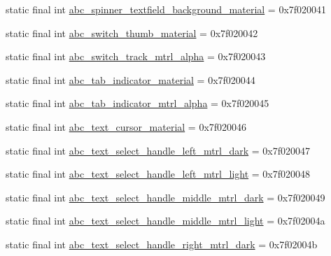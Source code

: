 \begin{CompactItemize}
static final int \hyperlink{classandroid_1_1support_1_1graphics_1_1drawable_1_1_r_1_1drawable_e69c3db62a9ce20a3c8dbb4e6c42f2a8}{abc\_\-spinner\_\-textfield\_\-background\_\-material} = 0x7f020041
\item 
static final int \hyperlink{classandroid_1_1support_1_1graphics_1_1drawable_1_1_r_1_1drawable_9b4d2fbe5c8590612a866f5e211bb76a}{abc\_\-switch\_\-thumb\_\-material} = 0x7f020042
\item 
static final int \hyperlink{classandroid_1_1support_1_1graphics_1_1drawable_1_1_r_1_1drawable_1c773f678c0e5fe94f5f5fa2d3718a0e}{abc\_\-switch\_\-track\_\-mtrl\_\-alpha} = 0x7f020043
\item 
static final int \hyperlink{classandroid_1_1support_1_1graphics_1_1drawable_1_1_r_1_1drawable_66a35af2884010c4c02a34a79a0c831f}{abc\_\-tab\_\-indicator\_\-material} = 0x7f020044
\item 
static final int \hyperlink{classandroid_1_1support_1_1graphics_1_1drawable_1_1_r_1_1drawable_5b6efd3f75589be66ce21a483ca86975}{abc\_\-tab\_\-indicator\_\-mtrl\_\-alpha} = 0x7f020045
\item 
static final int \hyperlink{classandroid_1_1support_1_1graphics_1_1drawable_1_1_r_1_1drawable_3205d486c3643f0a9fd0de914d79429a}{abc\_\-text\_\-cursor\_\-material} = 0x7f020046
\item 
static final int \hyperlink{classandroid_1_1support_1_1graphics_1_1drawable_1_1_r_1_1drawable_e15ef4635a557e04a3a9521aa81a5b57}{abc\_\-text\_\-select\_\-handle\_\-left\_\-mtrl\_\-dark} = 0x7f020047
\item 
static final int \hyperlink{classandroid_1_1support_1_1graphics_1_1drawable_1_1_r_1_1drawable_26f2adb3b3aec7fd1beecebf61aa0baf}{abc\_\-text\_\-select\_\-handle\_\-left\_\-mtrl\_\-light} = 0x7f020048
\item 
static final int \hyperlink{classandroid_1_1support_1_1graphics_1_1drawable_1_1_r_1_1drawable_5ed1a90a38f215c6389c6ff7c5d0e2c9}{abc\_\-text\_\-select\_\-handle\_\-middle\_\-mtrl\_\-dark} = 0x7f020049
\item 
static final int \hyperlink{classandroid_1_1support_1_1graphics_1_1drawable_1_1_r_1_1drawable_12c452c89b8de490f1575b5663e5ec61}{abc\_\-text\_\-select\_\-handle\_\-middle\_\-mtrl\_\-light} = 0x7f02004a
\item 
static final int \hyperlink{classandroid_1_1support_1_1graphics_1_1drawable_1_1_r_1_1drawable_ade77b011d891f2e79793ec479b749e5}{abc\_\-text\_\-select\_\-handle\_\-right\_\-mtrl\_\-dark} = 0x7f02004b
\item 

\end{CompactItemize}
